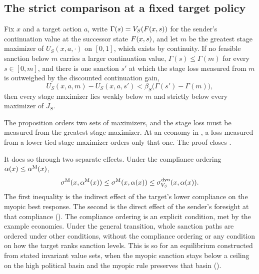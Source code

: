 \subsection{The strict comparison at a fixed target policy}
\label{sec:moved-main-2026-10-13:strict}

\begin{proposition}
\label{prop:strict-dominance}
Fix $x$ and a target action $a$, write $\Gamma(s)=V_S(F(x,s))$ for the
sender's continuation value at the successor state $F(x,s)$, and let $m$ be the greatest stage maximizer of
$U_S(x,a,\cdot)$ on $[0,1]$, which exists by continuity. If no feasible
sanction below $m$ carries a larger continuation value, $\Gamma(s)\le\Gamma(m)$ for every $s\in[0,m]$, and
there is one sanction $s'$ at which the stage loss measured from $m$ is
outweighed by the discounted continuation gain,
\[
U_S(x,a,m)-U_S(x,a,s')<\beta_S\bigl(\Gamma(s')-\Gamma(m)\bigr),
\]
then every stage maximizer lies weakly below $m$ and strictly below every
maximizer of $J_S$.
\end{proposition}

 The proposition
orders two sets of maximizers, and the stage loss must be measured from the
greatest stage maximizer. At an economy in
, a loss measured from a lower tied stage maximizer orders
only that one. The proof closes .

 It does so through two
separate effects.
Under the compliance ordering $\alpha(x)\le\alpha^{\mathrm{M}}(x)$,
\[
\sigma^{\mathrm{M}}(x,\alpha^{\mathrm{M}}(x))
\le \sigma^{\mathrm{M}}(x,\alpha(x))
\le \sigma^{\mathrm{dyn}}_{V_S}(x,\alpha(x)).
\]
The first inequality is the indirect effect of the target's lower compliance on
the myopic best response. The second is the direct effect of the sender's foresight
at that compliance (). The compliance ordering is an
explicit condition, met by the example economies. Under the general transition, whole sanction paths are ordered under other conditions, without the compliance ordering
or any condition on how the target ranks sanction levels. This is so
for an equilibrium constructed from stated invariant
value sets, when the myopic sanction stays below a ceiling on the high political
basin and the myopic rule preserves that basin
().

